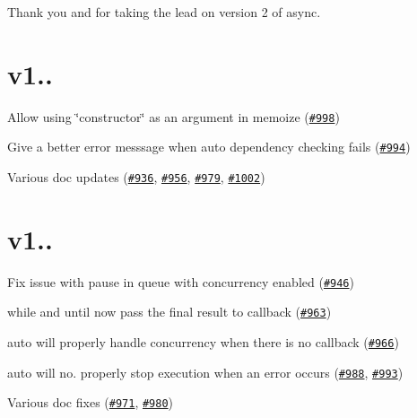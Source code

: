 Thank you \href{github.com/aearly}{\tt {\bfseries }} and \href{github.com/megawac}{\tt {\bfseries }} for taking the lead on version 2 of async. 



\section*{v1..}


\begin{DoxyItemize}
\item Allow using {\ttfamily \char`\"{}constructor\char`\"{}} as an argument in {\ttfamily memoize} (\href{https://github.com/caolan/async/issues/998}{\tt \#998})
\item Give a better error messsage when {\ttfamily auto} dependency checking fails (\href{https://github.com/caolan/async/issues/994}{\tt \#994})
\item Various doc updates (\href{https://github.com/caolan/async/issues/936}{\tt \#936}, \href{https://github.com/caolan/async/issues/956}{\tt \#956}, \href{https://github.com/caolan/async/issues/979}{\tt \#979}, \href{https://github.com/caolan/async/issues/1002}{\tt \#1002})
\end{DoxyItemize}

\section*{v1..}


\begin{DoxyItemize}
\item Fix issue with {\ttfamily pause} in {\ttfamily queue} with concurrency enabled (\href{https://github.com/caolan/async/issues/946}{\tt \#946})
\item {\ttfamily while} and {\ttfamily until} now pass the final result to callback (\href{https://github.com/caolan/async/issues/963}{\tt \#963})
\item {\ttfamily auto} will properly handle concurrency when there is no callback (\href{https://github.com/caolan/async/issues/966}{\tt \#966})
\item {\ttfamily auto} will no. properly stop execution when an error occurs (\href{https://github.com/caolan/async/issues/988}{\tt \#988}, \href{https://github.com/caolan/async/issues/993}{\tt \#993})
\item Various doc fixes (\href{https://github.com/caolan/async/issues/971}{\tt \#971}, \href{https://github.com/caolan/async/issues/980}{\tt \#980})
\end{DoxyItemize}

